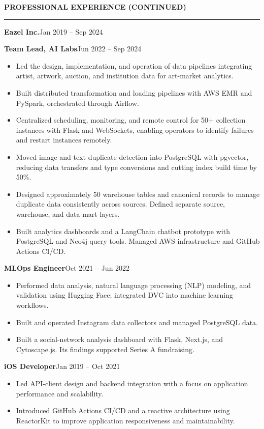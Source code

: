 \documentclass[a4paper,10pt]{article}
\newcommand{\position}[2]{\vspace{6pt}\textbf{#1}\hfill{\small\color{muted}#2}\par}
\begin{document}
\newpage
{\fontsize{12}{15}\selectfont\bfseries\color{accent}PROFESSIONAL EXPERIENCE (CONTINUED)}\par
\vspace{3pt}\hrule\vspace{5pt}
\textbf{\color{accent}Eazel Inc.}\hfill{\small\color{muted}Jan 2019 -- Sep 2024}\par

\position{Team Lead, AI Labs}{Jun 2022 -- Sep 2024}
\begin{itemize}
\item Led the design, implementation, and operation of data pipelines integrating artist, artwork, auction, and institution data for art-market analytics.
\item Built distributed transformation and loading pipelines with AWS EMR and PySpark, orchestrated through Airflow.
\item Centralized scheduling, monitoring, and remote control for 50+ collection instances with Flask and WebSockets, enabling operators to identify failures and restart instances remotely.
\item Moved image and text duplicate detection into PostgreSQL with pgvector, reducing data transfers and type conversions and cutting index build time by 50\%.
\item Designed approximately 50 warehouse tables and canonical records to manage duplicate data consistently across sources. Defined separate source, warehouse, and data-mart layers.
\item Built analytics dashboards and a LangChain chatbot prototype with PostgreSQL and Neo4j query tools. Managed AWS infrastructure and GitHub Actions CI/CD.
\end{itemize}

\position{MLOps Engineer}{Oct 2021 -- Jun 2022}
\begin{itemize}
\item Performed data analysis, natural language processing (NLP) modeling, and validation using Hugging Face; integrated DVC into machine learning workflows.
\item Built and operated Instagram data collectors and managed PostgreSQL data.
\item Built a social-network analysis dashboard with Flask, Next.js, and Cytoscape.js. Its findings supported Series A fundraising.
\end{itemize}

\position{iOS Developer}{Jan 2019 -- Oct 2021}
\begin{itemize}
\item Led API-client design and backend integration with a focus on application performance and scalability.
\item Introduced GitHub Actions CI/CD and a reactive architecture using ReactorKit to improve application responsiveness and maintainability.
\end{itemize}
\end{document}

